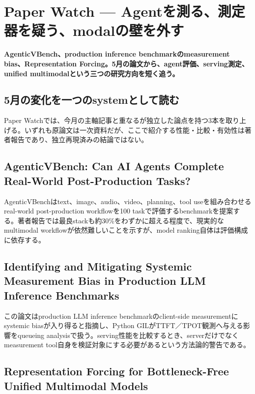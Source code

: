 \section{Paper Watch — Agentを測る、測定器を疑う、modalの壁を外す}
\noindent\textbf{AgenticVBench、production inference benchmarkのmeasurement bias、Representation Forcing。5月の論文から、agent評価、serving測定、unified multimodalという三つの研究方向を短く追う。}\autocite{src-24add4f36a45,src-99d7ea892e92,src-ea2dcbeedd27}

\subsection{5月の変化を一つのsystemとして読む}

Paper Watchでは、今月の主軸記事と重なるが独立した論点を持つ3本を取り上げる。いずれも原論文は一次資料だが、ここで紹介する性能・比較・有効性は著者報告であり、独立再現済みの結論ではない。\autocite{src-24add4f36a45,src-99d7ea892e92,src-ea2dcbeedd27}


\subsection{AgenticVBench: Can AI Agents Complete Real-World Post-Production Tasks?}

AgenticVBenchはtext、image、audio、video、planning、tool useを組み合わせるreal-world post-production workflowを100 taskで評価するbenchmarkを提案する。著者報告では最良stackも約30\%をわずかに超える程度で、現実的なmultimodal workflowが依然難しいことを示すが、model ranking自体は評価構成に依存する。\autocite{src-ea2dcbeedd27}


\subsection{Identifying and Mitigating Systemic Measurement Bias in Production LLM Inference Benchmarks}

この論文はproduction LLM inference benchmarkのclient-side measurementにsystemic biasが入り得ると指摘し、Python GILがTTFT／TPOT観測へ与える影響をqueueing analysisで扱う。serving性能を比較するとき、serverだけでなくmeasurement tool自身を検証対象にする必要があるという方法論的警告である。\autocite{src-24add4f36a45}


\subsection{Representation Forcing for Bottleneck-Free Unified Multimodal Models}

